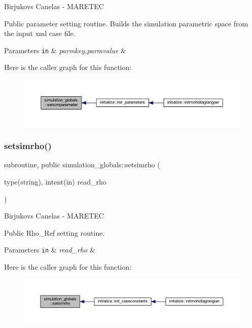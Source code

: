 Birjukovs Canelas -\/ M\+A\+R\+E\+T\+EC 

Public parameter setting routine. Builds the simulation parametric space from the input xml case file. 
\begin{DoxyParams}[1]{Parameters}
\mbox{\tt in}  & {\em parmkey,parmvalue} & \\
\hline
\end{DoxyParams}
Here is the caller graph for this function\+:
\nopagebreak
\begin{figure}[H]
\begin{center}
\leavevmode
\includegraphics[width=350pt]{namespacesimulation__globals_a7a127d09219ed57ad8db3507dbbefe5b_icgraph}
\end{center}
\end{figure}
\mbox{\label{namespacesimulation__globals_acb970c567557ee852be95afe8d3f2b0f}} 
\subsubsection{\texorpdfstring{setsimrho()}{setsimrho()}}
{\footnotesize\ttfamily subroutine, public simulation\+\_\+globals\+::setsimrho (\begin{DoxyParamCaption}\item[{type(string), intent(in)}]{read\+\_\+rho }\end{DoxyParamCaption})}



Birjukovs Canelas -\/ M\+A\+R\+E\+T\+EC 

Public Rho\+\_\+\+Ref setting routine. 
\begin{DoxyParams}[1]{Parameters}
\mbox{\tt in}  & {\em read\+\_\+rho} & \\
\hline
\end{DoxyParams}
Here is the caller graph for this function\+:
\nopagebreak
\begin{figure}[H]
\begin{center}
\leavevmode
\includegraphics[width=350pt]{namespacesimulation__globals_acb970c567557ee852be95afe8d3f2b0f_icgraph}
\end{center}
\end{figure}


